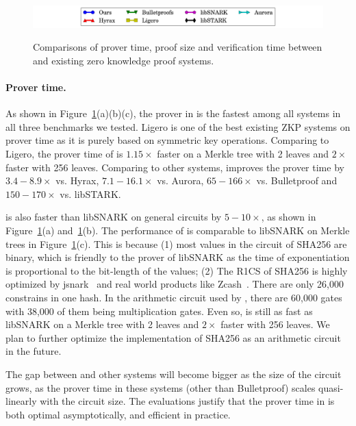 \begin{figure}[t!]
{	%
}%
\quad
\centering
\includegraphics[width = 5in]{legend.pdf}\vspace{-0.2in}
\caption{\label{fig:Allcom}Comparisons of prover time, proof size and verification time between \name{} and existing zero knowledge proof systems.}
\vspace{-.25in}
\end{figure}


\paragraph{Prover time.} As shown in Figure~\ref{fig:Allcom}(a)(b)(c), the prover in \name is the fastest among all systems in all three benchmarks we tested. \textsf{Ligero} is one of the best existing ZKP systems on prover time as it is purely based on symmetric key operations. Comparing to \textsf{Ligero}, the prover time of \name is $1.15\times$ faster on a Merkle tree with 2 leaves and $2\times$ faster with 256 leaves. Comparing to other systems, \name improves the prover time by $3.4-8.9\times$ vs. \textsf{Hyrax}, $7.1-16.1\times$ vs. \textsf{Aurora}, $65-166\times$ vs. \textsf{Bulletproof} and $150-170\times$ vs. \textsf{libSTARK}. 

\name is also faster than \textsf{libSNARK} on general circuits by $5-10\times$, as shown in Figure~\ref{fig:Allcom}(a) and~\ref{fig:Allcom}(b). The performance of \name is comparable to \textsf{libSNARK} on Merkle trees in Figure~\ref{fig:Allcom}(c). This is because (1) most values in the circuit of SHA256 are binary, which is friendly to the prover of \textsf{libSNARK} as the time of exponentiation is proportional to the bit-length of the values; (2) The R1CS of SHA256 is highly optimized by jsnark~\cite{jsnark} and real world products like Zcash~\cite{zerocash}. There are only 26,000 constrains in one hash. In the arithmetic circuit used by \name, there are 60,000 gates with 38,000 of them being multiplication gates. Even so, \name is still as fast as \textsf{libSNARK} on a Merkle tree with 2 leaves and $2\times$ faster with 256 leaves. We plan to further optimize the implementation of SHA256 as an arithmetic circuit in the future.

The gap between \name and other systems will become bigger as the size of the circuit grows, as the prover time in these systems (other than Bulletproof) scales quasi-linearly with the circuit size. The evaluations justify that the prover time in \name is both optimal asymptotically, and efficient in practice.

